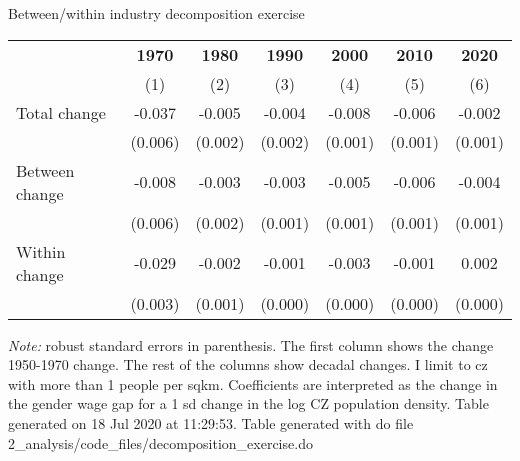 \begin{center}
\begin{threeparttable}[!h]
\caption{Between/within industry decomposition exercise}
\begin{tabular}{lcccccc}
\toprule
\toprule
&\multicolumn{1}{c}{\textbf{1970}}&\multicolumn{1}{c}{\textbf{1980}}&\multicolumn{1}{c}{\textbf{1990}}&\multicolumn{1}{c}{\textbf{2000}}&\multicolumn{1}{c}{\textbf{2010}}&\multicolumn{1}{c}{\textbf{2020}} \\
\textbf{}&\multicolumn{1}{c}{(1)}&\multicolumn{1}{c}{(2)}&\multicolumn{1}{c}{(3)}&\multicolumn{1}{c}{(4)}&\multicolumn{1}{c}{(5)}&\multicolumn{1}{c}{(6)} \\
\midrule
Total change        &      -0.037\sym{***}&      -0.005\sym{*}  &      -0.004\sym{*}  &      -0.008\sym{***}&      -0.006\sym{***}&      -0.002         \\
                    &     (0.006)         &     (0.002)         &     (0.002)         &     (0.001)         &     (0.001)         &     (0.001)         \\
Between change      &      -0.008         &      -0.003         &      -0.003         &      -0.005\sym{***}&      -0.006\sym{***}&      -0.004\sym{**} \\
                    &     (0.006)         &     (0.002)         &     (0.001)         &     (0.001)         &     (0.001)         &     (0.001)         \\
Within change       &      -0.029\sym{***}&      -0.002\sym{**} &      -0.001\sym{**} &      -0.003\sym{***}&      -0.001         &       0.002\sym{***}\\
                    &     (0.003)         &     (0.001)         &     (0.000)         &     (0.000)         &     (0.000)         &     (0.000)         \\
\bottomrule
\bottomrule
\end{tabular}
\begin{tablenotes}
\item \footnotesize \textit{Note:} robust standard errors in parenthesis. The first column shows the change 1950-1970 change. The rest of the columns show decadal changes. I limit to cz with more than 1 people per sqkm. Coefficients are interpreted as the change in the gender wage gap for a 1 sd change in the log CZ population density. Table generated on 18 Jul 2020 at 11:29:53. Table generated with do file 2\_analysis/code\_files/decomposition\_exercise.do
\end{tablenotes}
\end{threeparttable}
\end{center}

